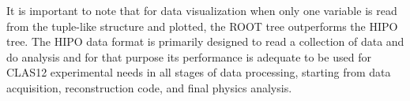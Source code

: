 \documentclass[preprint,12pt]{elsarticle}
\begin{document}
It is important to note that for data visualization when only one variable is read from the tuple-like structure and plotted, the ROOT tree outperforms the HIPO
tree. The HIPO data format is primarily designed to read a collection of data and do analysis and for that purpose its performance is adequate to be used
for CLAS12 experimental needs in all stages of data processing, starting from data acquisition, reconstruction code, and final physics analysis. 

 
 
 
\newpage


\end{document}
